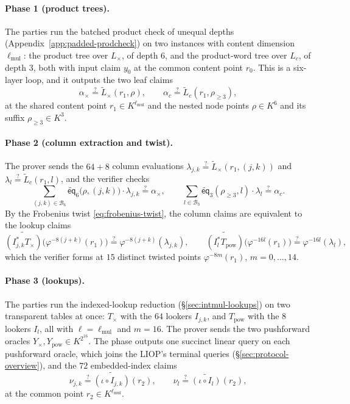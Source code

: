 \documentclass{article}
\theoremstyle{definition}
\newcommand*{\mle}{\widetilde}
\newcommand{\eq}{\mathsf{eq}}
\newcommand{\BB}{\mathcal{B}}
\begin{document}
\paragraph{Phase 1 (product trees).}
The parties run the batched product check of unequal depths (Appendix~\ref{app:padded-prodcheck}) on two instances with content dimension $\ell_\text{mul}$: the product tree over $L_\times$, of depth $6$, and the product-word tree over $L_c$, of depth $3$, both with input claim $y_0$ at the common content point $r_0$. This is a six-layer loop, and it outputs the two leaf claims
\[
  \alpha_\times \stackrel{?}{=} \mle{L}_\times(r_1, \rho), \qquad \alpha_c \stackrel{?}{=} \mle{L}_c(r_1, \rho_{\geq 3}),
\]
at the shared content point $r_1 \in K^{\ell_\text{mul}}$ and the nested node points $\rho \in K^6$ and its suffix $\rho_{\geq 3} \in K^3$.

\paragraph{Phase 2 (column extraction and twist).}
The prover sends the $64 + 8$ column evaluations $\lambda_{j, k} \stackrel{?}{=} \mle{L}_\times(r_1, (j, k))$ and $\lambda_l \stackrel{?}{=} \mle{L}_c(r_1, l)$, and the verifier checks
\[
  \sum_{(j, k) \in \BB_6} \mle{\eq}_6\bigl( \rho, (j, k) \bigr) \cdot \lambda_{j, k} \stackrel{?}{=} \alpha_\times, \qquad \sum_{l \in \BB_3} \mle{\eq}_3(\rho_{\geq 3}, l) \cdot \lambda_l \stackrel{?}{=} \alpha_c.
\]
By the Frobenius twist \eqref{eq:frobenius-twist}, the column claims are equivalent to the lookup claims
\[
  \mle{(I_{j, k}^* T_\times)}\bigl( \varphi^{-8(j + k)}(r_1) \bigr) \stackrel{?}{=} \varphi^{-8(j + k)}(\lambda_{j, k}), \qquad \mle{(I_l^* T_\text{pow})}\bigl( \varphi^{-16 l}(r_1) \bigr) \stackrel{?}{=} \varphi^{-16 l}(\lambda_l),
\]
which the verifier forms at $15$ distinct twisted points $\varphi^{-8m}(r_1)$, $m = 0, \ldots, 14$.

\paragraph{Phase 3 (lookups).}
The parties run the indexed-lookup reduction (\S\ref{sec:intmul-lookups}) on two transparent tables at once: $T_\times$ with the $64$ lookers $I_{j, k}$, and $T_\text{pow}$ with the $8$ lookers $I_l$, all with $\ell = \ell_\text{mul}$ and $m = 16$. The prover sends the two pushforward oracles $Y_\times, Y_\text{pow} \in K^{2^{16}}$. The phase outputs one succinct linear query on each pushforward oracle, which joins the LIOP's terminal queries (\S\ref{sec:protocol-overview}), and the $72$ embedded-index claims
\[
  \nu_{j, k} \stackrel{?}{=} \mle{(\iota \circ I_{j, k})}(r_2), \qquad \nu_l \stackrel{?}{=} \mle{(\iota \circ I_l)}(r_2),
\]
at the common point $r_2 \in K^{\ell_\text{mul}}$.
\end{document}

